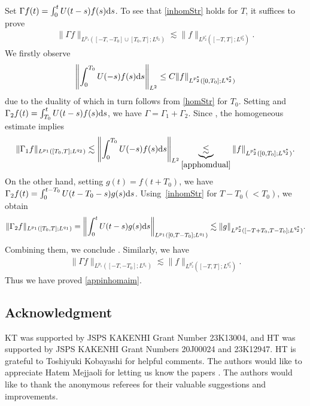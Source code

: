 \documentclass[10pt,a4paper]{amsart}
\numberwithin{equation}{section}
\begin{document}
Set $\Gamma f(t)=\int_0^tU(t-s)f(s){\rm d}s$.
To see that \eqref{inhomStr} holds for $T$, it suffices to prove
\begin{align}\label{appinhomaim}
\|\Gamma f\|_{L^{p_1}([-T,-T_0]\cup [T_0,T];L^{q_2})}\lesssim \|f\|_{L^{p_2^*}([-T,T];L^{q_2^*})}.
\end{align}
We firstly observe
\begin{align}\label{apphomdual}
\left\|\int_0^{T_0}U(-s)f(s){\rm d}s \right\|_{L^2}\leq C\|f\|_{L^{p_2^*}([0,T_0];L^{q_2^*})}
\end{align}
due to the duality of  which in turn follows from \eqref{homStr} for $T_0$. Setting  and $\Gamma_2f(t)=\int_{T_0}^tU(t-s)f(s){\rm d}s$, we have $\Gamma=\Gamma_1+\Gamma_2$. Since , the homogeneous estimate  implies
\begin{align*}
\|\Gamma_1 f\|_{L^{p_1}([T_0,T];L^{q_2})}\lesssim\left\|\int_0^{T_0}U(-s)f(s){\rm d}s \right\|_{L^2}\underbrace{\lesssim}_{\eqref{apphomdual}} \|f\|_{L^{p_2^*}([0,T_0];L^{q_2^*})}.
\end{align*}
On the other hand, setting $g(t)=f(t+T_0)$, we have $\Gamma_2f(t)=\int_0^{t-T_0}U(t-T_0-s)g(s){\rm d}s$. Using~\eqref{inhomStr} for $T-T_0(<T_0)$, we obtain
\begin{align*}
\|\Gamma_2f\|_{L^{p_1}([T_0,T];L^{q_1})}=\left\|\int_0^{t}U(t-s)g(s){\rm d}s\right\|_{L^{p_1}([0,T-T_0];L^{q_1})}\lesssim \|g\|_{L^{p_2^*}([-T+T_0,T-T_0];L^{q_2^*})}.
\end{align*}
Combining them, we conclude . Similarly, we have
\begin{align*}
\|\Gamma f\|_{L^{p_1}([-T,-T_0];L^{q_1})}\lesssim \|f\|_{L^{p_2^*}([-T,T];L^{q_2^*})}.
\end{align*}
Thus we have proved \eqref{appinhomaim}.


\subsection*{Acknowledgment}
KT was supported by JSPS KAKENHI Grant Number 23K13004, and HT was supported by JSPS KAKENHI Grant Numbers 20J00024 and 23K12947. HT is grateful to Toshiyuki Kobayashi for helpful comments. The authors would like to appreciate Hatem Mejjaoli for letting us know the papers \cite{BMMS,M}. The authors would like to thank the anonymous referees for their valuable suggestions and improvements.
\end{document}
